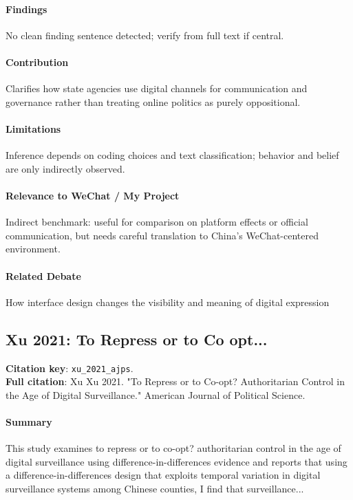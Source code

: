 \documentclass[12pt]{article}
\begin{document}
\paragraph{Findings} No clean finding sentence detected; verify from full text if central.

\paragraph{Contribution} Clarifies how state agencies use digital channels for communication and governance rather than treating online politics as purely oppositional.

\paragraph{Limitations} Inference depends on coding choices and text classification; behavior and belief are only indirectly observed.

\paragraph{Relevance to WeChat / My Project} Indirect benchmark: useful for comparison on platform effects or official communication, but needs careful translation to China's WeChat-centered environment.

\paragraph{Related Debate} How interface design changes the visibility and meaning of digital expression


\subsection{Xu 2021: To Repress or to Co opt...}
\textbf{Citation key}: \texttt{xu\_2021\_ajps}.\\
\textbf{Full citation}: Xu Xu 2021. "To Repress or to Co-opt? Authoritarian Control in the Age of Digital Surveillance." American Journal of Political Science.

\paragraph{Summary} This study examines to repress or to co-opt? authoritarian control in the age of digital surveillance using difference-in-differences evidence and reports that using a difference-in-differences design that exploits temporal variation in digital surveillance systems among Chinese counties, I find that surveillance...
\end{document}
